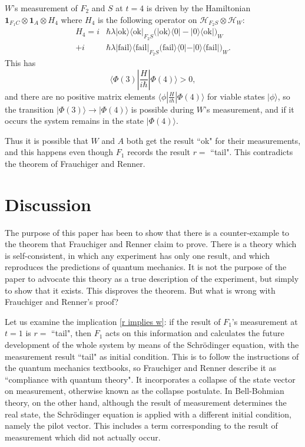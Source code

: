 \documentclass[12pt,reqno]{article}
\newcommand{\ok}{\text{ok}}
\newcommand{\fail}{\text{fail}}
\renewcommand{\(}{\left(}
\renewcommand{\)}{\right)}
\renewcommand{\.}{\centerdot}
\newcommand{\1}{\mathbf{1}}
\newcommand{\ox}{\otimes}
\newcommand{\<}{\langle}
\renewcommand{\>}{\rangle}
\renewcommand{\H}{\mathcal{H}}
\theoremstyle{definition}
\theoremstyle{remark}
\numberwithin{equation}{section}
\begin{document}
$W$'s measurement of $F_2$ and $S$ at $t = 4$ is driven by the Hamiltonian $\1_{F_1C}\ox\1_A\ox H_4$ where $H_4$ is the following operator on $\H_{F_2S}\ox\H_W$:
\begin{align*}
H_4 = i&\hbar\lambda|\ok\>\<\ok|_{F_2S}\big(|\ok\>\<0|-|0\>\<\ok|\big)_W\\
+i&\hbar\lambda|\fail\>\<\fail|_{F_2S}\big(\fail\>\<0| - |0\>\<\fail|\big)_W.
\end{align*}
This has
\[
\<\Phi(3)|\frac{H}{i\hbar}|\Phi(4)\> > 0,
\]
and there are no positive matrix elements $\<\phi|\tfrac{H}{i\hbar}|\Phi(4)\>$ for viable states $|\phi\>$, so the transition $|\Phi(3)\> \rightarrow |\Phi(4)\>$ is possible during $W$'s measurement, and if it occurs the system remains in the state $|\Phi(4)\>$. 

Thus it is possible that $W$ and $A$ both get the result ``ok" for their measurements, and this happens even though $F_1$ records the result $r =$ ``tail". This contradicts the theorem of Frauchiger and Renner.

\section{Discussion}

The purpose of this paper has been to show that there is a counter-example to the theorem that Frauchiger and Renner claim to prove. There is a theory which is self-consistent, in which any experiment has only one result, and which reproduces the predictions of quantum mechanics. It is not the purpose of the paper to advocate this theory as a true description of the experiment, but simply to show that it exists. This disproves the theorem. But what is wrong with Frauchiger and Renner's proof?

Let us examine the implication \eqref{r implies w}: if the result of $F_1$'s measurement at $t = 1$ is $r = $ ``tail", then $F_1$ acts on this information and calculates the future development of the whole system by means of the Schr\"odinger equation, with the measurement result ``tail" as initial condition. This is to follow the instructions of the quantum mechanics textbooks, so Frauchiger and Renner describe it as ``compliance with quantum theory". It incorporates a collapse of the state vector on measurement, otherwise known as the collapse postulate. In Bell-Bohmian theory, on the other hand, although the result of measurement determines the real state, the Schr\"odinger equation is applied with a different initial condition, namely the pilot vector. This includes a term corresponding to the result of measurement which did not actually occur. 
\end{document}
